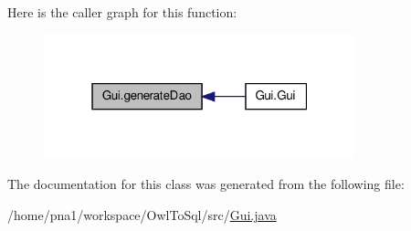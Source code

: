 Here is the caller graph for this function:\nopagebreak
\begin{figure}[H]
\begin{center}
\leavevmode
\includegraphics[width=256pt]{class_gui_a328763db8d277612d5855a8ee4894cb1_icgraph}
\end{center}
\end{figure}




The documentation for this class was generated from the following file:\begin{DoxyCompactItemize}
\item 
/home/pna1/workspace/OwlToSql/src/\hyperlink{_gui_8java}{Gui.java}\end{DoxyCompactItemize}
